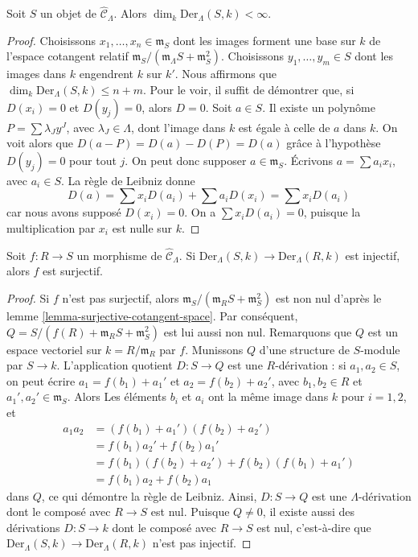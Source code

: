 \begin{lemma}
\label{lemma-derivations-finite}
Soit $S$ un objet de $\widehat{\mathcal{C}}_\Lambda$.
Alors $\dim_k \text{Der}_\Lambda(S, k) < \infty$.
\end{lemma}

\begin{proof}
Choisissons $x_1, \ldots, x_n \in \mathfrak m_S$ dont les images forment une
base sur $k$ de l'espace cotangent relatif
$\mathfrak m_S/(\mathfrak m_\Lambda S + \mathfrak m_S^2)$.
Choisissons $y_1, \ldots, y_m \in S$ dont les images dans $k$ engendrent $k$
sur $k'$. Nous affirmons que $\dim_k \text{Der}_\Lambda(S, k) \leq n + m$.
Pour le voir, il suffit de démontrer que, si $D(x_i) = 0$ et
$D(y_j) = 0$, alors $D = 0$. Soit $a \in S$. Il existe un polynôme
$P = \sum \lambda_J y^J$, avec $\lambda_J \in \Lambda$, dont l'image dans
$k$ est égale à celle de $a$ dans $k$. On voit alors que
$D(a - P) = D(a) - D(P) = D(a)$ grâce à l'hypothèse
$D(y_j) = 0$ pour tout $j$. On peut donc supposer
$a \in \mathfrak m_S$. Écrivons $a = \sum a_i x_i$, avec $a_i \in S$.
La règle de Leibniz donne
$$
D(a) = \sum x_iD(a_i) + \sum a_iD(x_i) = \sum x_iD(a_i)
$$
car nous avons supposé $D(x_i) = 0$. On a $\sum x_iD(a_i) = 0$, puisque la
multiplication par $x_i$ est nulle sur $k$.
\end{proof}

\begin{lemma}
\label{lemma-derivations-surjective}
Soit $f : R \to S$ un morphisme de $\widehat{\mathcal{C}}_\Lambda$.
Si $\text{Der}_\Lambda(S, k) \to \text{Der}_\Lambda(R, k)$ est injectif,
alors $f$ est surjectif.
\end{lemma}

\begin{proof}
Si $f$ n'est pas surjectif, alors
$\mathfrak m_S/(\mathfrak m_R S + \mathfrak m_S^2)$ est non nul d'après le
lemme \ref{lemma-surjective-cotangent-space}. Par conséquent,
$Q = S/(f(R) + \mathfrak m_R S + \mathfrak m_S^2)$ est lui aussi non nul.
Remarquons que $Q$ est un espace vectoriel sur $k = R/\mathfrak m_R$ par
$f$. Munissons $Q$ d'une structure de $S$-module par
$S \to k$. L'application quotient $D : S \to Q$ est une $R$-dérivation : si
$a_1, a_2 \in S$, on peut écrire $a_1 = f(b_1) + a_1'$ et
$a_2 = f(b_2) + a_2'$, avec $b_1, b_2 \in R$ et
$a_1', a_2' \in \mathfrak m_S$. Alors
Les éléments $b_i$ et $a_i$ ont la même image dans $k$ pour $i = 1, 2$, et
\begin{align*}
a_1a_2 & = (f(b_1) + a_1')(f(b_2) + a_2') \\
& = f(b_1)a_2' + f(b_2)a_1' \\
& = f(b_1)(f(b_2) + a_2') + f(b_2)(f(b_1) + a_1') \\
& = f(b_1)a_2 + f(b_2)a_1
\end{align*}
dans $Q$, ce qui démontre la règle de Leibniz. Ainsi, $D : S \to Q$ est une
$\Lambda$-dérivation dont le composé avec $R \to S$ est nul. Puisque
$Q \not = 0$, il existe aussi des dérivations $D : S \to k$ dont le composé
avec $R \to S$ est nul, c'est-à-dire que
$\text{Der}_\Lambda(S, k) \to \text{Der}_\Lambda(R, k)$ n'est pas injectif.
\end{proof}

